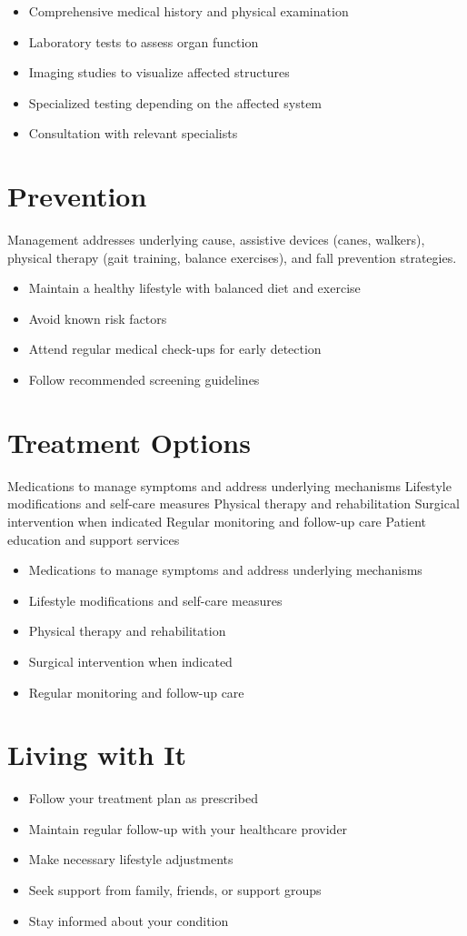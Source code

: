 \begin{itemize}[noitemsep]
  \item Comprehensive medical history and physical examination
  \item Laboratory tests to assess organ function
  \item Imaging studies to visualize affected structures
  \item Specialized testing depending on the affected system
  \item Consultation with relevant specialists
\end{itemize}
\section{Prevention}
Management addresses underlying cause, assistive devices (canes, walkers), physical therapy (gait training, balance exercises), and fall prevention strategies.

\begin{itemize}[noitemsep]
  \item Maintain a healthy lifestyle with balanced diet and exercise
  \item Avoid known risk factors
  \item Attend regular medical check-ups for early detection
  \item Follow recommended screening guidelines
\end{itemize}
\section{Treatment Options}
Medications to manage symptoms and address underlying mechanisms Lifestyle modifications and self-care measures Physical therapy and rehabilitation Surgical intervention when indicated Regular monitoring and follow-up care Patient education and support services

\begin{itemize}[noitemsep]
  \item Medications to manage symptoms and address underlying mechanisms
  \item Lifestyle modifications and self-care measures
  \item Physical therapy and rehabilitation
  \item Surgical intervention when indicated
  \item Regular monitoring and follow-up care
\end{itemize}
\section{Living with It}
\begin{itemize}[noitemsep]
  \item Follow your treatment plan as prescribed
  \item Maintain regular follow-up with your healthcare provider
  \item Make necessary lifestyle adjustments
  \item Seek support from family, friends, or support groups
  \item Stay informed about your condition
\end{itemize}
